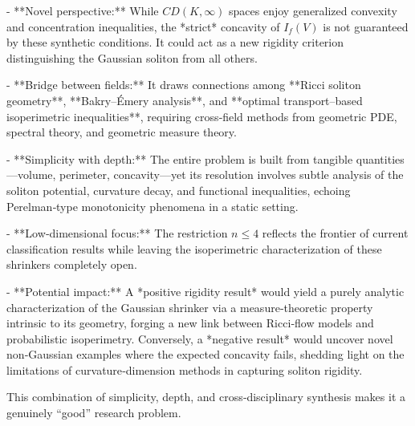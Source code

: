 - **Novel perspective:**  
  While \(CD(K,\infty)\) spaces enjoy generalized convexity and concentration inequalities, the *strict* concavity of \(I_f(V)\) is not guaranteed by these synthetic conditions. It could act as a new rigidity criterion distinguishing the Gaussian soliton from all others.

- **Bridge between fields:**  
  It draws connections among **Ricci soliton geometry**, **Bakry–Émery analysis**, and **optimal transport–based isoperimetric inequalities**, requiring cross‑field methods from geometric PDE, spectral theory, and geometric measure theory.

- **Simplicity with depth:**  
  The entire problem is built from tangible quantities—volume, perimeter, concavity—yet its resolution involves subtle analysis of the soliton potential, curvature decay, and functional inequalities, echoing Perelman‑type monotonicity phenomena in a static setting.

- **Low‑dimensional focus:**  
  The restriction \(n\le4\) reflects the frontier of current classification results while leaving the isoperimetric characterization of these shrinkers completely open.

- **Potential impact:**  
  A *positive rigidity result* would yield a purely analytic characterization of the Gaussian shrinker via a measure‑theoretic property intrinsic to its geometry, forging a new link between Ricci‑flow models and probabilistic isoperimetry.  
  Conversely, a *negative result* would uncover novel non‑Gaussian examples where the expected concavity fails, shedding light on the limitations of curvature‑dimension methods in capturing soliton rigidity.

This combination of simplicity, depth, and cross‑disciplinary synthesis makes it a genuinely “good” research problem.